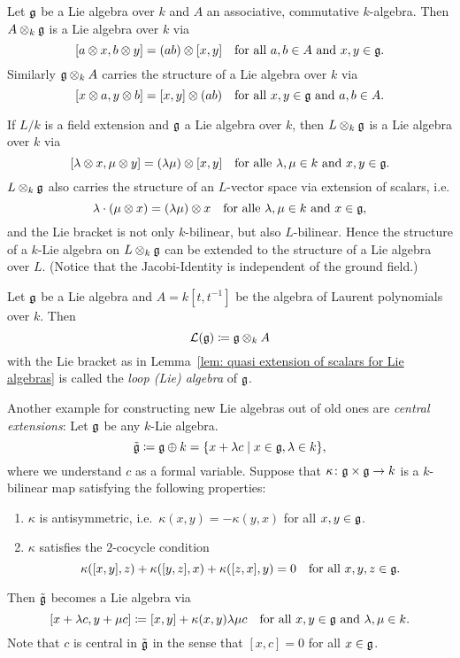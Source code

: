 \begin{lem}\label{lem: quasi extension of scalars for Lie algebras}
Let $\mathfrak{g}$ be a Lie algebra over $k$ and $A$ an associative, commutative $k$-algebra. Then $A \otimes_k \mathfrak{g}$ is a Lie algebra over $k$ via
\[
 [a \otimes x, b \otimes y] = (ab) \otimes [x,y]
 \quad
 \text{for all $a,b \in A$ and $x,y \in \mathfrak{g}$}.
\]
Similarly $\mathfrak{g} \otimes_k A$ carries the structure of a Lie algebra over $k$ via
\[
 [x \otimes a, y \otimes b] = [x,y] \otimes (ab)
 \quad
 \text{for all $x,y \in \mathfrak{g}$ and $a,b \in A$}.
\]
\end{lem}


\begin{expl}
 If $L/k$ is a field extension and $\mathfrak{g}$ a Lie algebra over $k$, then $L \otimes_k \mathfrak{g}$ is a Lie algebra over $k$ via
 \[
  [\lambda \otimes x, \mu \otimes y] = (\lambda \mu) \otimes [x,y]
  \quad
  \text{for alle $\lambda, \mu \in k$ and $x,y \in \mathfrak{g}$}.
 \]
 $L \otimes_k \mathfrak{g}$ also carries the structure of an $L$-vector space via extension of scalars, i.e.
 \[
  \lambda \cdot (\mu \otimes x) = (\lambda \mu) \otimes x
  \quad
  \text{for alle $\lambda, \mu \in k$ and $x \in \mathfrak{g}$},
 \]
 and the Lie bracket is not only $k$-bilinear, but also $L$-bilinear. Hence the structure of a $k$-Lie algebra on $L \otimes_k \mathfrak{g}$ can be extended to the structure of a Lie algebra over $L$. (Notice that the Jacobi-Identity is independent of the ground field.)
\end{expl}


\begin{defi}
 Let $\mathfrak{g}$ be a Lie algebra and $A = k[t,t^{-1}]$ be the algebra of Laurent polynomials over $k$. Then
 \[
  \mathcal{L}(\mathfrak{g}) \coloneqq \mathfrak{g} \otimes_k A
 \]
 with the Lie bracket as in Lemma~\ref{lem: quasi extension of scalars for Lie algebras} is called the \emph{loop (Lie) algebra} of $\mathfrak{g}$.
\end{defi}


Another example for constructing new Lie algebras out of old ones are \emph{central extensions}: Let $\mathfrak{g}$ be any $k$-Lie algebra.
\[
 \tilde{\mathfrak{g}}
 \coloneqq \mathfrak{g} \oplus k
 = \{x + \lambda c \mid x \in \mathfrak{g}, \lambda \in k\},
\]
where we understand $c$ as a formal variable. Suppose that $\kappa \colon \mathfrak{g} \times \mathfrak{g} \to k$ is a $k$-bilinear map satisfying the following properties:
\begin{enumerate}
 \item
  $\kappa$ is antisymmetric, i.e.\ $\kappa(x,y) = -\kappa(y,x)$ for all $x,y \in \mathfrak{g}$.
 \item
  $\kappa$ satisfies the $2$-cocycle condition
  \[
   \kappa([x,y],z) + \kappa([y,z],x) + \kappa([z,x],y) = 0
   \quad
   \text{for all $x,y,z \in \mathfrak{g}$}.
  \]
\end{enumerate}
Then $\tilde{\mathfrak{g}}$ becomes a Lie algebra via
\[
 [x + \lambda c, y + \mu c] \coloneqq [x,y] + \kappa(x,y) \lambda \mu c
 \quad \text{for all $x,y \in \mathfrak{g}$ and $\lambda, \mu \in k$.}
\]
Note that $c$ is central in $\tilde{\mathfrak{g}}$ in the sense that $[x,c] = 0$ for all $x \in \mathfrak{g}$.


